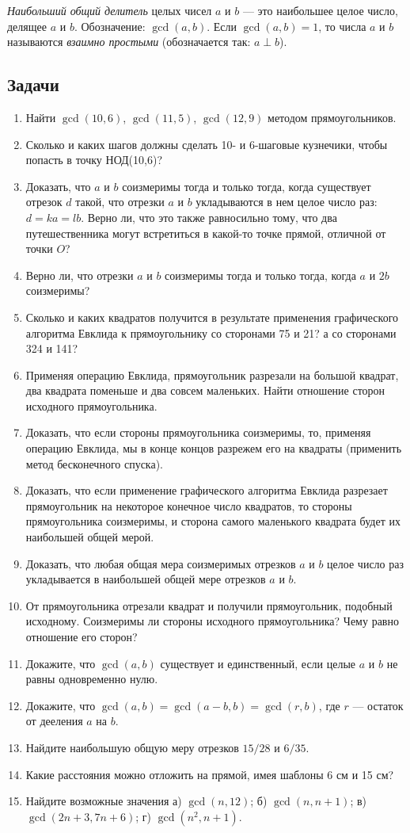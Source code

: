 \textit{Наибольший общий делитель} целых чисел $a$ и $b$ --- это наибольшее целое число, делящее $a$ и $b$. Обозначение: $\gcd(a,b)$. Если $\gcd(a,b)=1$, то числа $a$ и $b$ называются \textit{взаимно простыми} (обозначается так: $a\perp b$).

\subsection*{Задачи}
\begin{enumerate}
\item Найти $\gcd(10,6)$, $\gcd(11,5)$, $\gcd(12,9)$ методом прямоугольников.
\item Сколько и каких шагов должны сделать 10- и 6-шаговые кузнечики, чтобы попасть в точку НОД(10,6)?
\item Доказать, что $a$ и $b$ соизмеримы тогда и только тогда, когда существует отрезок $d$ такой, что отрезки $a$ и $b$ укладываются в нем целое число раз: $d=ka=lb$. Верно ли, что это также равносильно тому, что два путешественника могут встретиться в какой-то точке прямой, отличной от точки $O$?
\item Верно ли, что отрезки $a$ и $b$ соизмеримы тогда и только тогда, когда $a$ и $2b$ соизмеримы?
\item Сколько и каких квадратов получится в результате применения графического алгоритма Евклида к прямоугольнику со сторонами 75 и 21? а со сторонами 324 и 141?
\item Применяя операцию Евклида, прямоугольник разрезали на большой квадрат, два квадрата поменьше и два совсем маленьких. Найти отношение сторон исходного прямоугольника.
\item Доказать, что если стороны прямоугольника соизмеримы, то, применяя операцию Евклида, мы в конце концов разрежем его на квадраты (применить метод бесконечного спуска).
\item Доказать, что если применение графического алгоритма Евклида разрезает прямоугольник на некоторое конечное число квадратов, то стороны прямоугольника соизмеримы, и сторона самого маленького квадрата будет их наибольшей общей мерой.
\item Доказать, что любая общая мера соизмеримых отрезков $a$ и $b$ целое число раз укладывается в наибольшей общей мере отрезков $a$ и $b$.
\item От прямоугольника отрезали квадрат и получили прямоугольник, подобный исходному. Соизмеримы ли стороны исходного прямоугольника? Чему равно отношение его сторон?
\item Докажите, что $\gcd(a,b)$ существует и единственный, если целые $a$ и $b$ не равны одновременно нулю.
\item Докажите, что $\gcd(a,b)=\gcd(a-b,b)=\gcd(r,b)$, где $r$ --- остаток от дееления $a$ на $b$.
\item Найдите наибольшую общую меру отрезков $15/28$ и $6/35$.
\item Какие расстояния можно отложить на прямой, имея шаблоны 6 см и 15 см?
\item Найдите возможные значения а) $\gcd(n,12)$; б) $\gcd(n,n+1)$; в) $\gcd(2n+3,7n+6)$; г) $\gcd(n^2,n+1)$.
\end{enumerate}


